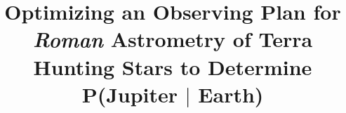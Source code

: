 \documentclass[twocolumn]{aastex631}
\begin{document}
\title{Optimizing an Observing Plan for \textit{Roman} Astrometry of \linebreak Terra Hunting Stars to Determine P(Jupiter $|$ Earth)}


\end{document}
